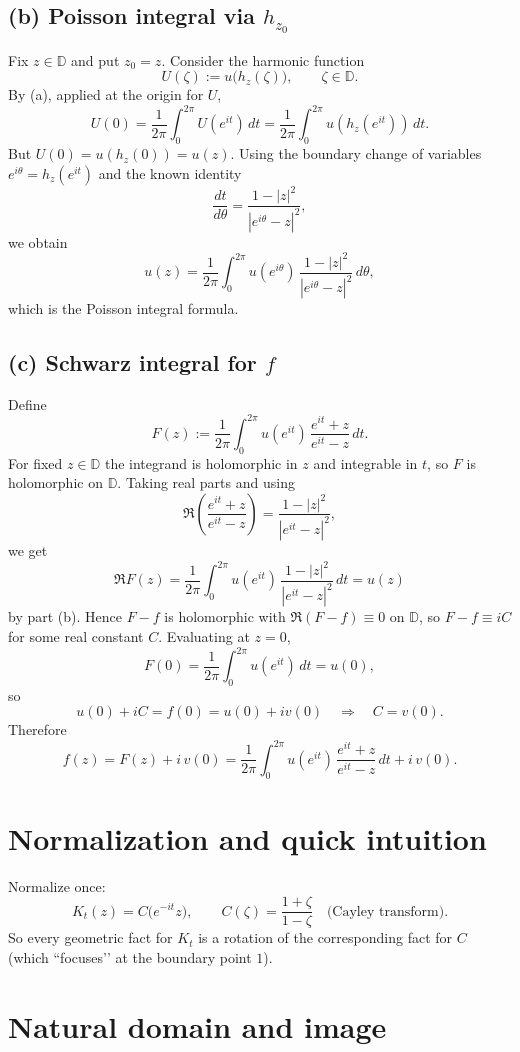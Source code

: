 \documentclass[11pt]{article}
\begin{document}
	\subsection*{(b) Poisson integral via $h_{z_0}$}
	Fix $z\in\mathbb D$ and put $z_0=z$. Consider the harmonic function
	\[
	U(\zeta):=u\big(h_{z}(\zeta)\big),\qquad \zeta\in\mathbb D.
	\]
	By (a), applied at the origin for $U$,
	\[
	U(0)=\frac{1}{2\pi}\int_{0}^{2\pi} U(e^{it})\,dt
	=\frac{1}{2\pi}\int_{0}^{2\pi} u\!\left(h_{z}(e^{it})\right)\,dt .
	\]
	But $U(0)=u(h_z(0))=u(z)$. Using the boundary change of variables $e^{i\theta}=h_{z}(e^{it})$ and the known identity
	\[
	\frac{dt}{d\theta}
	=\frac{1-|z|^{2}}{|e^{i\theta}-z|^{2}},
	\]
	we obtain
	\[
	u(z)=\frac{1}{2\pi}\int_{0}^{2\pi} u(e^{i\theta})\,\frac{1-|z|^{2}}{|e^{i\theta}-z|^{2}}\,d\theta,
	\]
	which is the Poisson integral formula.
	
	\subsection*{(c) Schwarz integral for $f$}
	Define
	\[
	F(z):=\frac{1}{2\pi}\int_{0}^{2\pi} u(e^{it})\,\frac{e^{it}+z}{e^{it}-z}\,dt.
	\]
	For fixed $z\in\mathbb D$ the integrand is holomorphic in $z$ and integrable in $t$, so $F$ is holomorphic on $\mathbb D$. Taking real parts and using
	\[
	\Re\!\left(\frac{e^{it}+z}{e^{it}-z}\right)=\frac{1-|z|^{2}}{|e^{it}-z|^{2}},
	\]
	we get
	\[
	\Re F(z)=\frac{1}{2\pi}\int_{0}^{2\pi} u(e^{it})\,\frac{1-|z|^{2}}{|e^{it}-z|^{2}}\,dt
	=u(z)
	\]
	by part (b). Hence $F-f$ is holomorphic with \(\Re(F-f)\equiv0\) on $\mathbb D$, so $F-f\equiv iC$ for some real constant $C$. Evaluating at $z=0$,
	\[
	F(0)=\frac{1}{2\pi}\int_{0}^{2\pi} u(e^{it})\,dt = u(0),
	\]
	so
	\[
	u(0)+iC=f(0)=u(0)+iv(0)\quad\Rightarrow\quad C=v(0).
	\]
	Therefore
	\[
	f(z)=F(z)+i\,v(0)
	=\frac{1}{2\pi}\int_{0}^{2\pi} u(e^{it})\,\frac{e^{it}+z}{e^{it}-z}\,dt + i\,v(0).
	\]

	\section*{Normalization and quick intuition}
	
	Normalize once:
	\[
	K_t(z)=C\!\big(e^{-it}z\big), 
	\qquad
	C(\zeta)=\frac{1+\zeta}{1-\zeta}\quad\text{(Cayley transform).}
	\]
	So every geometric fact for $K_t$ is a rotation of the corresponding fact for $C$ (which “focuses’’ at the boundary point $1$).
	
	\section*{Natural domain and image}
	
\end{document}
